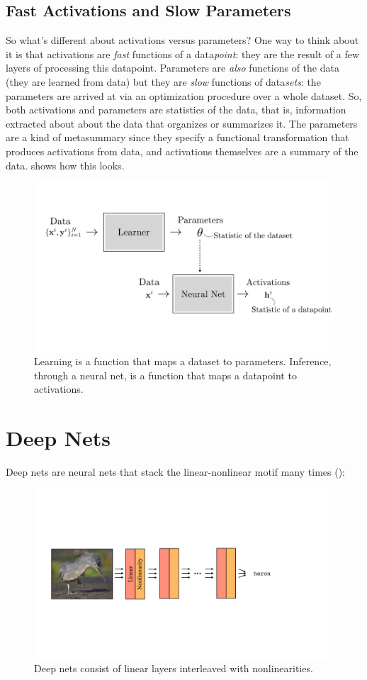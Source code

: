 \subsection{Fast Activations and Slow Parameters}%
So what's different about activations versus parameters? One way to think about it is that activations are \textit{fast} functions of a data\textit{point}: they are the result of a few layers of processing this datapoint. Parameters are \textit{also} functions of the data (they are learned from data) but they are \textit{slow} functions of data\textit{sets}: the parameters are arrived at via an optimization procedure over a whole dataset. So, both activations and parameters are statistics of the data, that is, information extracted about about the data that organizes or summarizes it. The parameters are a kind of metasummary since they specify a functional transformation that produces activations from data, and activations themselves are a summary of the data. \Fig{\ref{fig:neural_nets:params_vs_activations}} shows how this looks.
\begin{figure}[h]
\centerline{
\includegraphics[width=0.7\linewidth]{figures/neural_nets/params_vs_activations.pdf}
}
\caption{Learning is a function that maps a dataset to parameters. Inference, through a neural net, is a function that maps a datapoint to activations.}
\label{fig:neural_nets:params_vs_activations}
\end{figure}

\section{Deep Nets}
Deep nets are neural nets that stack the linear-nonlinear motif many times (\fig{\ref{fig:deep_nets}}):
\begin{figure}[h]
    \centerline{
    \includegraphics[width=0.65\linewidth]{./figures/neural_nets/deep_nets.pdf}
    }
    \caption{Deep nets consist of linear layers interleaved with nonlinearities.}
    \label{fig:deep_nets}
\end{figure}

